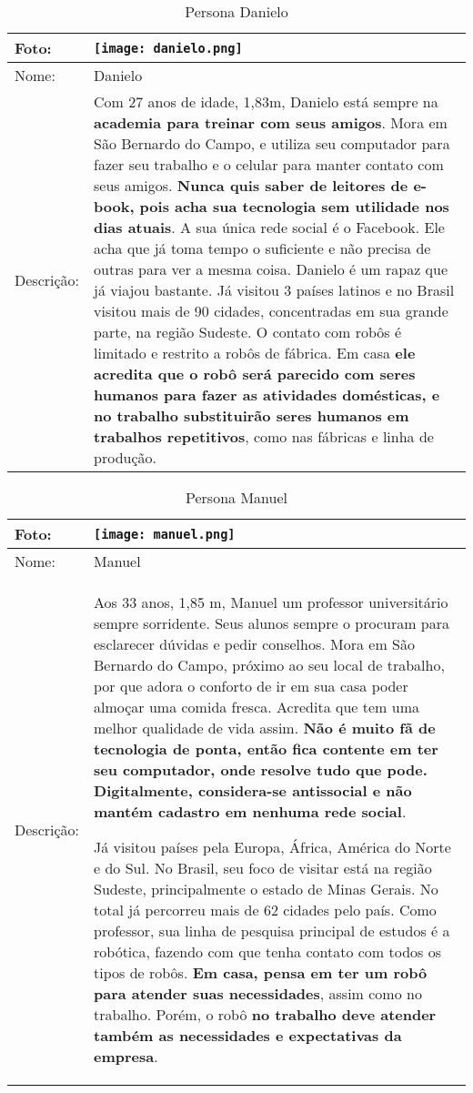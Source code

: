 \begin{table}[!ht]
	\caption{Persona Danielo}
	\label{tab:danielo}
	\centering
	\begin{tabular}{ m{2 cm} | m{13cm} }
		\hline
		Foto: & \rule{0cm}{2.7cm} \texttt{[image: danielo.png]} \\
		\hline
		Nome: & Danielo \\
		\hline
		Descrição: & Com 27 anos de idade, 1,83m, Danielo está sempre na \textbf{academia para treinar com seus amigos}. Mora em São Bernardo do Campo, e utiliza seu computador para fazer seu trabalho e o celular para manter contato com seus amigos. \textbf{Nunca quis saber de leitores de e-book, pois acha sua tecnologia sem utilidade nos dias atuais}. A sua única rede social é o Facebook. Ele acha que já toma tempo o suficiente e não precisa de outras para ver a mesma coisa. Danielo é um rapaz que já viajou bastante. Já visitou 3 países latinos e no Brasil visitou mais de 90 cidades, concentradas em sua grande parte, na região Sudeste. O contato com robôs é limitado e restrito a robôs de fábrica. Em casa \textbf{ele acredita que o robô será parecido com seres humanos para fazer as atividades domésticas, e no trabalho substituirão seres humanos em trabalhos repetitivos}, como nas fábricas e linha de produção.\\
		\hline
	\end{tabular}
\end{table}

\begin{table}[!ht]
	\caption{Persona Manuel}
	\label{tab:manuel}
	\centering
	\begin{tabular}{ m{2 cm} | m{13cm} }
		\hline
		Foto: & \rule{0cm}{2.7cm} \texttt{[image: manuel.png]} \\
		\hline
		Nome: & Manuel \\
		\hline
		Descrição: & Aos 33 anos, 1,85 m,  Manuel um professor universitário sempre sorridente. Seus alunos sempre o procuram para esclarecer dúvidas e pedir conselhos. Mora em São Bernardo do Campo, próximo ao seu local de trabalho, por que adora o conforto de ir em sua casa poder almoçar uma comida fresca. Acredita que tem uma melhor qualidade de vida assim. \textbf{Não é muito fã de tecnologia de ponta, então fica contente em ter seu computador, onde resolve tudo que pode. Digitalmente, considera-se antissocial e não mantém cadastro em nenhuma rede social}.

		Já visitou países pela Europa, África, América do Norte e do Sul. No Brasil, seu foco de visitar está na região Sudeste, principalmente o estado de Minas Gerais. No total já percorreu mais de 62 cidades pelo país. Como professor, sua linha de pesquisa principal de estudos é a robótica, fazendo com que tenha contato com todos os tipos de robôs. \textbf{Em casa, pensa em ter um robô para atender suas necessidades}, assim como no trabalho. Porém, o robô \textbf{no trabalho deve atender também as necessidades e expectativas da empresa}.\\
		\hline
	\end{tabular}
\end{table}

